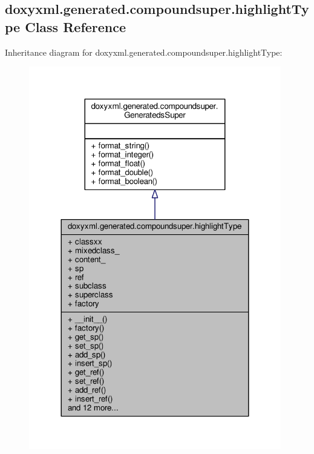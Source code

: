 \subsection{doxyxml.\+generated.\+compoundsuper.\+highlight\+Type Class Reference}
\label{classdoxyxml_1_1generated_1_1compoundsuper_1_1highlightType}


Inheritance diagram for doxyxml.\+generated.\+compoundsuper.\+highlight\+Type\+:
\nopagebreak
\begin{figure}[H]
\begin{center}
\leavevmode
\includegraphics[width=312pt]{d5/d8d/classdoxyxml_1_1generated_1_1compoundsuper_1_1highlightType__inherit__graph}
\end{center}
\end{figure}


